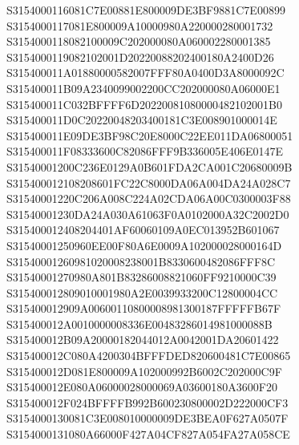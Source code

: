\documentclass[12pt,a4paper]{article}
\begin{document}
\begin{framed}
{S3154000116081C7E00881E800009DE3BF9881C7E00899\newline
S3154000117081E800009A10000980A220000280001732\newline
S3154000118082100009C202000080A060002280001385\newline
S3154000119082102001D20220088202400180A2400D26\newline
S315400011A01880000582007FFF80A0400D3A8000092C\newline
S315400011B09A2340099002200CC202000080A06000E1\newline
S315400011C032BFFFF6D20220081080000482102001B0\newline
S315400011D0C20220048203400181C3E008901000014E\newline
S315400011E09DE3BF98C20E8000C22EE011DA06800051\newline
S315400011F08333600C82086FFF9B336005E406E0147E\newline
S31540001200C236E0129A0B601FDA2CA001C20680009B\newline
S315400012108208601FC22C8000DA06A004DA24A028C7\newline
S31540001220C206A008C224A02CDA06A00C0300003F88\newline
S31540001230DA24A030A61063F0A0102000A32C2002D0\newline
S315400012408204401AF60060109A0EC013952B601067\newline
S31540001250960EE00F80A6E0009A102000028000164D\newline
S31540001260981020008238001B8330600482086FFF8C\newline
S31540001270980A801B83286008821060FF9210000C39\newline
S315400012809010001980A2E0039933200C12800004CC\newline
S315400012909A00600110800008981300187FFFFFB67F\newline
S315400012A0010000008336E00483286014981000088B\newline
S315400012B09A20000182044012A0042001DA20601422\newline
S315400012C080A4200304BFFFDED820600481C7E00865\newline
S315400012D081E800009A102000992B6002C202000C9F\newline
S315400012E080A06000028000069A03600180A3600F20\newline
S315400012F024BFFFFB992B600230800002D222000CF3\newline
S3154000130081C3E008010000009DE3BEA0F627A0507F\newline
S3154000131080A66000F427A04CF827A054FA27A058CE\newline
}
\end{framed}
\end{document}
